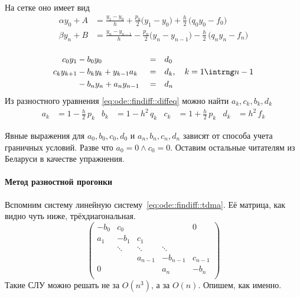 \documentclass{trlnotes}
\begin{document}
\begin{enumerate}
        На сетке оно имеет вид
        \begin{equation*}
          \begin{split}
            α y_0 + A &= \frac{y_1 - y_{0}}{h} + \frac{p_0}{2} \biggl(y_1 - y_{0}\biggr)
            + \frac{h}{2}\,\biggl(q_0 y_0 - f_0\biggr) \\
            β y_n + B &= \frac{y_n - y_{n-1}}{h} - \frac{p_n}{2} \biggl(y_n - y_{n-1}\biggr)
            - \frac{h}{2}\,\biggl(q_n y_n - f_n\biggr) \\
            \end{split}
        \end{equation*}
\end{enumerate}

\begin{equation}\label{eq:ode::findiff::tdma}
  \begin{aligned}
    c_0 y_1     &- b_0 y_0                  &&=& &d_0 \\
    c_k y_{k+1} &- b_k y_k+ y_{k-1} a_k     &&=& &d_k,\quad k= 1\intrng n-1 \\
                &- b_n y_n + a_n y_{n-1}    &&=& &d_n 
  \end{aligned}
\end{equation}
Из разностного уравнения \eqref{eq:ode::findiff::diffeq} можно найти $a_k, c_k, b_k, d_k$
\[
  \begin{aligned}
    a_k &= 1- \tfrac{h}2 \, p_k &
    b_k &= 1- h^2 \, q_k &
    c_k &= 1+ \tfrac{h}2 \, p_k &
    d_k &= {h}^2 \, f_k 
  \end{aligned}
\]

Явные выражения для $a_0, b_0, c_0, d_0$ и $a_n, b_n, c_n, d_n$
зависят от способа учета граничных условий. Разве что $a_0 = 0\land c_0 = 0$.
Оставим остальные читателям из Беларуси в качестве упражнения.

\paragraph{Метод разностной прогонки}
\label{par:ode::fintdma}
Вспомним систему линейную систему~\ref{eq:ode::findiff::tdma}.
Её матрица, как видно чуть ниже, трёхдиагональная.
\[
  \begin{pmatrix}
    -b_0   & c_0    &         &          & 0       \\
    a_1    & -b_1   & c_1     &          &         \\
           & \ddots & \ddots  & \ddots             \\
           &        & a_{n-1} & -b_{n-1} & c_{n-1} \\
    0      &        &         & a_n      & -b_n    \\
  \end{pmatrix}
\]
Такие СЛУ можно решать не за $O(n^3)$, а за $O(n)$. Опишем, как именно.
\end{document}
